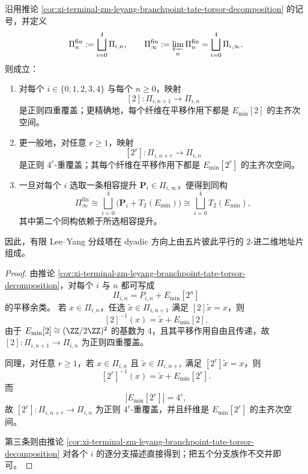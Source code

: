 \begin{corollary}\label{cor:xi-terminal-zm-leyang-finite-branch-regular-4ary-address}
沿用推论 \ref{cor:xi-terminal-zm-leyang-branchpoint-tate-torsor-decomposition} 的记号，并定义
\[
\Pi_n^{\mathrm{fin}}:=\bigsqcup_{i=0}^{4}\Pi_{i,n},
\qquad
\Pi_\infty^{\mathrm{fin}}:=\varprojlim_n \Pi_n^{\mathrm{fin}}
=\bigsqcup_{i=0}^{4}\Pi_{i,\infty}.
\]
则成立：
\begin{enumerate}
  \item 对每个 \(i\in\{0,1,2,3,4\}\) 与每个 \(n\ge 0\)，映射
  \[
  [2]:\Pi_{i,n+1}\longrightarrow \Pi_{i,n}
  \]
  是正则四重覆盖；更精确地，每个纤维在平移作用下都是 \(E_{\min}[2]\) 的主齐次空间。
  \item 更一般地，对任意 \(r\ge 1\)，映射
  \[
  [2^r]:\Pi_{i,n+r}\longrightarrow \Pi_{i,n}
  \]
  是正则 \(4^r\)-重覆盖；其每个纤维在平移作用下都是 \(E_{\min}[2^r]\) 的主齐次空间。
  \item 一旦对每个 \(i\) 选取一条相容提升 \(\mathbf P_i\in\Pi_{i,\infty}\)，便得到同构
  \[
  \Pi_\infty^{\mathrm{fin}}
  \cong
  \bigsqcup_{i=0}^{4}\bigl(\mathbf P_i+T_2(E_{\min})\bigr)
  \cong
  \bigsqcup_{i=0}^{4}T_2(E_{\min}),
  \]
  其中第二个同构依赖于所选相容提升。
\end{enumerate}
因此，有限 Lee--Yang 分歧塔在 dyadic 方向上由五片彼此平行的 \(2\)-进二维地址片组成。
\end{corollary}
\begin{proof}
由推论 \ref{cor:xi-terminal-zm-leyang-branchpoint-tate-torsor-decomposition}，对每个 \(i\) 与 \(n\) 都可写成
\[
\Pi_{i,n}=P_{i,n}+E_{\min}[2^n]
\]
的平移余类。
若 \(x\in\Pi_{i,n}\)，任选 \(\tilde x\in\Pi_{i,n+1}\) 满足 \([2]\tilde x=x\)，则
\[
[2]^{-1}(x)=\tilde x+E_{\min}[2].
\]
由于 \(E_{\min}[2]\cong(\ZZ/2\ZZ)^2\) 的基数为 \(4\)，且其平移作用自由且传递，故 \([2]:\Pi_{i,n+1}\to\Pi_{i,n}\) 为正则四重覆盖。

同理，对任意 \(r\ge 1\)，若 \(x\in\Pi_{i,n}\) 且 \(\tilde x\in\Pi_{i,n+r}\) 满足 \([2^r]\tilde x=x\)，则
\[
[2^r]^{-1}(x)=\tilde x+E_{\min}[2^r].
\]
而
\[
|E_{\min}[2^r]|=4^r,
\]
故 \([2^r]:\Pi_{i,n+r}\to\Pi_{i,n}\) 为正则 \(4^r\)-重覆盖，并且纤维是 \(E_{\min}[2^r]\) 的主齐次空间。

第三条则由推论 \ref{cor:xi-terminal-zm-leyang-branchpoint-tate-torsor-decomposition} 对各个 \(i\) 的逐分支描述直接得到；把五个分支族作不交并即可。
\end{proof}
